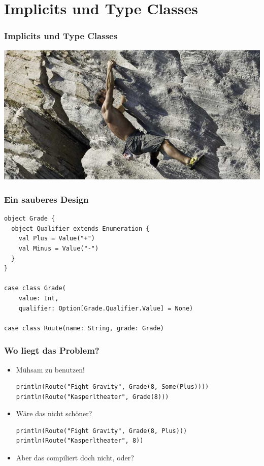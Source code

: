 \documentclass{beamer}
\begin{document}
\section{Implicits und Type Classes}

\begin{frame}
  \frametitle{Implicits und Type Classes}
  \includegraphics[width=\linewidth]{img/free-climbing.jpg}
\end{frame}

\begin{frame}[fragile]
  \frametitle{Ein sauberes Design}
    \begin{lstlisting}
object Grade {
  object Qualifier extends Enumeration {
    val Plus = Value("+")
    val Minus = Value("-")
  }
}

case class Grade(
    value: Int, 
    qualifier: Option[Grade.Qualifier.Value] = None)

case class Route(name: String, grade: Grade)
    \end{lstlisting}
\end{frame}

\begin{frame}[fragile]
  \frametitle{Wo liegt das Problem?}
  \begin{itemize}
    \item M\"uhsam zu benutzen!
    \begin{lstlisting}
println(Route("Fight Gravity", Grade(8, Some(Plus))))
println(Route("Kasperltheater", Grade(8)))
    \end{lstlisting}
    \item W\"are das nicht sch\"oner?
    \begin{lstlisting}
println(Route("Fight Gravity", Grade(8, Plus)))
println(Route("Kasperltheater", 8))
    \end{lstlisting}
    \item Aber das compiliert doch nicht, oder?
  \end{itemize}
\end{frame}
\end{document}
